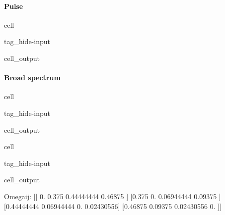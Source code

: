 \documentclass[letterpaper,10pt,english]{jupyterBook}
\begin{document}
\paragraph{Pulse}
\label{\detokenize{ch/quantum-mechanics/history/matrix-mechanics/electron-perturbation-numerical:pulse}}
\begin{sphinxuseclass}{cell}
\begin{sphinxuseclass}{tag_hide-input}\begin{sphinxVerbatimOutput}

\begin{sphinxuseclass}{cell_output}
\noindent{}

\end{sphinxuseclass}\end{sphinxVerbatimOutput}

\end{sphinxuseclass}
\end{sphinxuseclass}

\paragraph{Broad spectrum}
\label{\detokenize{ch/quantum-mechanics/history/matrix-mechanics/electron-perturbation-numerical:broad-spectrum}}
\begin{sphinxuseclass}{cell}
\begin{sphinxuseclass}{tag_hide-input}\begin{sphinxVerbatimOutput}

\begin{sphinxuseclass}{cell_output}
\noindent{}

\end{sphinxuseclass}\end{sphinxVerbatimOutput}

\end{sphinxuseclass}
\end{sphinxuseclass}
\begin{sphinxuseclass}{cell}
\begin{sphinxuseclass}{tag_hide-input}\begin{sphinxVerbatimOutput}

\begin{sphinxuseclass}{cell_output}
\begin{sphinxVerbatim}[commandchars=\\\{\}]
Omega\PYGZus{}ij:
[[ 0.          0.375       0.44444444  0.46875   ]
 [\PYGZhy{}0.375       0.          0.06944444  0.09375   ]
 [\PYGZhy{}0.44444444 \PYGZhy{}0.06944444  0.          0.02430556]
 [\PYGZhy{}0.46875    \PYGZhy{}0.09375    \PYGZhy{}0.02430556  0.        ]]
\end{sphinxVerbatim}

\end{sphinxuseclass}\end{sphinxVerbatimOutput}

\end{sphinxuseclass}
\end{sphinxuseclass}
\sphinxstepscope
\end{document}
